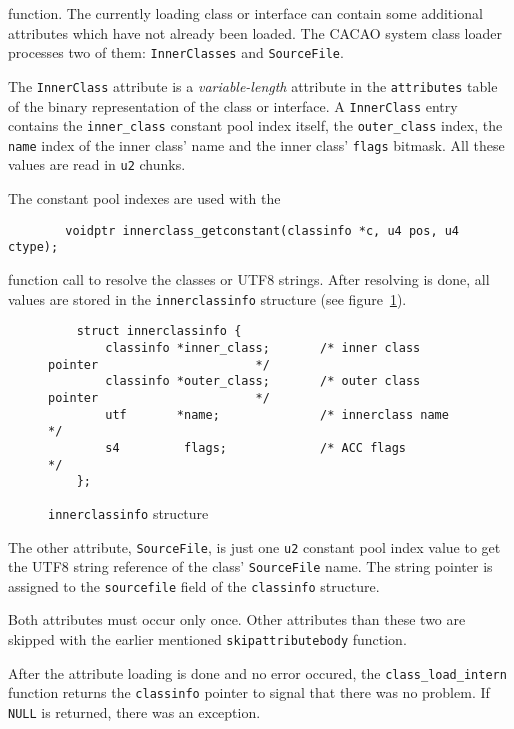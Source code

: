 function. The currently loading class or interface can contain some
additional attributes which have not already been loaded. The CACAO
system class loader processes two of them: \texttt{InnerClasses} and
\texttt{SourceFile}.

The \texttt{InnerClass} attribute is a \textit{variable-length}
attribute in the \texttt{attributes} table of the binary
representation of the class or interface. A \texttt{InnerClass} entry
contains the \texttt{inner\_class} constant pool index itself, the
\texttt{outer\_class} index, the \texttt{name} index of the inner
class' name and the inner class' \texttt{flags} bitmask. All these
values are read in \texttt{u2} chunks.

The constant pool indexes are used with the

\begin{verbatim}
        voidptr innerclass_getconstant(classinfo *c, u4 pos, u4 ctype);
\end{verbatim}

function call to resolve the classes or UTF8 strings. After resolving
is done, all values are stored in the \texttt{innerclassinfo}
structure (see figure~\ref{innerclassinfostructure}).

\begin{figure}[h]
\begin{verbatim}
    struct innerclassinfo {
        classinfo *inner_class;       /* inner class pointer                      */
        classinfo *outer_class;       /* outer class pointer                      */
        utf       *name;              /* innerclass name                          */
        s4         flags;             /* ACC flags                                */
    };
\end{verbatim}
\caption{\texttt{innerclassinfo} structure}
\label{innerclassinfostructure}
\end{figure}

The other attribute, \texttt{SourceFile}, is just one \texttt{u2}
constant pool index value to get the UTF8 string reference of the
class' \texttt{SourceFile} name. The string pointer is assigned to the
\texttt{sourcefile} field of the \texttt{classinfo} structure.

Both attributes must occur only once. Other attributes than these two
are skipped with the earlier mentioned \texttt{skipattributebody}
function.

After the attribute loading is done and no error occured, the
\texttt{class\_load\_intern} function returns the \texttt{classinfo}
pointer to signal that there was no problem. If \texttt{NULL} is
returned, there was an exception.


